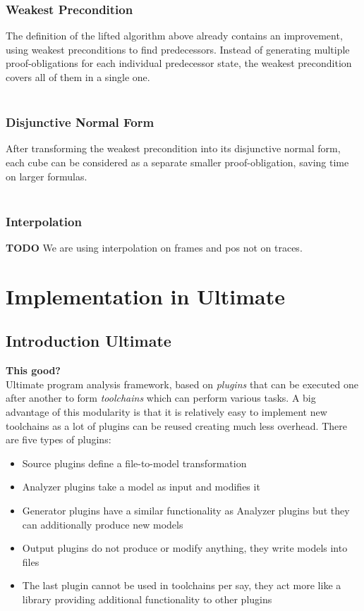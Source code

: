 \documentclass[11pt, a4paper, BCOR=10mm, ngerman, oneside]{scrbook}
\begin{document}
\subsection{Weakest Precondition}
The definition of the lifted algorithm above already contains an improvement, using weakest preconditions to find predecessors. Instead of generating multiple proof-obligations for each individual predecessor state, the weakest precondition covers all of them in a single one. \\ \\


\subsection{Disjunctive Normal Form}
After transforming the weakest precondition into its disjunctive normal form, each cube can be considered as a separate smaller proof-obligation, saving time on larger formulas.\\ \\

\subsection{Interpolation}
\textbf{TODO}
We are using interpolation on frames and pos not on traces.

\pagebreak


\chapter{Implementation in Ultimate}
\section{Introduction Ultimate}
\textbf{This good?} \\
Ultimate program analysis framework, based on \textsl{plugins} that can be executed one after another to form \textsl{toolchains} which can perform various tasks. A big advantage of this modularity is that it is relatively easy to implement new toolchains as a lot of plugins can be reused creating much less overhead. There are five types of plugins: 
\begin{itemize}
\item Source plugins define a file-to-model transformation

\item  Analyzer plugins take a model as input and modifies it

\item Generator plugins have a similar functionality as Analyzer plugins but they can additionally produce new models

\item Output plugins do not produce or modify anything, they write models into files

\item The last plugin cannot be used in toolchains per say, they act more like a library providing additional functionality to other plugins

\end{itemize}
\end{document}
